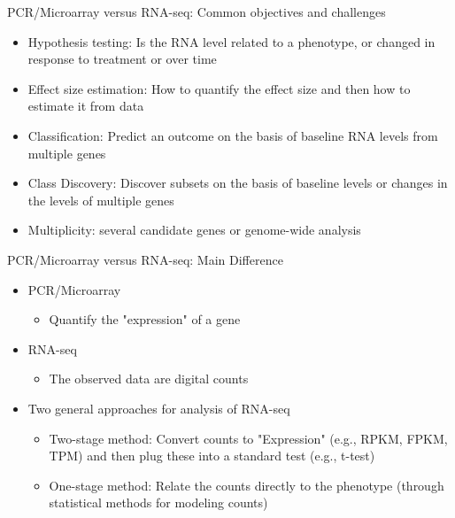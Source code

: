 \documentclass[xcolor=x11names,compress]{beamer}\usepackage[]{graphicx}\usepackage[]{color}
\begin{document}
\begin{frame}{PCR/Microarray versus RNA-seq: Common objectives and challenges}
  \begin{itemize}
  \item Hypothesis testing: Is the RNA level related to a phenotype, or changed
        in response to treatment or over time
  \item Effect size estimation: How to quantify the effect size and then how to estimate it from data 
  \item Classification: Predict an outcome on the basis of baseline RNA levels from multiple genes
  \item Class Discovery: Discover subsets on the basis of baseline levels or changes in the levels
        of multiple genes
  \item Multiplicity: several candidate genes or genome-wide analysis
  \end{itemize}
\end{frame}


\begin{frame}{PCR/Microarray versus RNA-seq: Main Difference}
  \begin{itemize}
  \item PCR/Microarray
    \begin{itemize}
    \item Quantify the "expression" of a gene
    \end{itemize}
  \item RNA-seq
    \begin{itemize}
    \item The observed data are digital counts
    \end{itemize}
  \item Two general approaches for analysis of RNA-seq
    \begin{itemize}
    \item Two-stage method: Convert counts to "Expression" (e.g., RPKM, FPKM, TPM) and then 
      plug these into a standard test (e.g., t-test) 
    \item One-stage method: Relate the counts directly to the phenotype (through statistical methods for modeling counts)
    \end{itemize}
  \end{itemize}
\end{frame}
\end{document}
